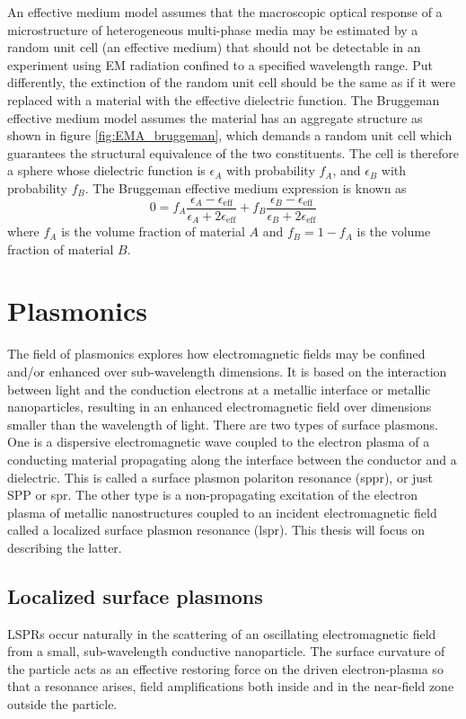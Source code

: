 An effective medium model assumes that the macroscopic optical response of a microstructure of heterogeneous multi-phase media may be estimated by a random unit cell (an effective medium) that should not be detectable in an experiment using EM radiation confined to a specified wavelength range. Put differently, the extinction of the random unit cell should be the same as if it were replaced with a material with the effective dielectric function. The Bruggeman effective medium model assumes the material has an aggregate structure as shown in figure \ref{fig:EMA_bruggeman}, which demands a random unit cell which guarantees the structural equivalence of the two constituents. The cell is therefore a sphere whose dielectric function is $\epsilon_A$ with probability $f_A$, and $\epsilon_B$ with probability $f_B$. The Bruggeman effective medium expression is known as
\begin{equation}
    0 = f_A \frac{\epsilon_A - \epsilon_\text{eff}}{\epsilon_A+2\epsilon_\text{eff}} + f_B \frac{\epsilon_B - \epsilon_\text{eff}}{\epsilon_B+2\epsilon_\text{eff}}
    \label{eq:EMA_Bruggeman}
\end{equation}
where $f_A$ is the volume fraction of material $A$ and $f_B = 1 - f_A$ is the volume fraction of material $B$\cite{hans_arwin}.
\section{Plasmonics}
The field of plasmonics explores how electromagnetic fields may be confined and/or enhanced over sub-wavelength dimensions. It is based on the interaction between light and the conduction electrons at a metallic interface or metallic nanoparticles, resulting in an enhanced electromagnetic field over dimensions smaller than the wavelength of light. There are two types of surface plasmons. One is a dispersive electromagnetic wave coupled to the electron plasma of a conducting material propagating along the interface between the conductor and a dielectric. This is called a surface plasmon polariton resonance (\ac{sppr}), or just SPP or \ac{spr}. The other type is a non-propagating excitation of the electron plasma of metallic nanostructures coupled to an incident electromagnetic field called a localized surface plasmon resonance (\ac{lspr}). This thesis will focus on describing the latter.

\subsection{Localized surface plasmons}
LSPRs occur naturally in the scattering of an oscillating electromagnetic field from a small, sub-wavelength conductive nanoparticle. The surface curvature of the particle acts as an effective restoring force on the driven electron-plasma so that a resonance arises, field amplifications both inside and in the near-field zone outside the particle.

